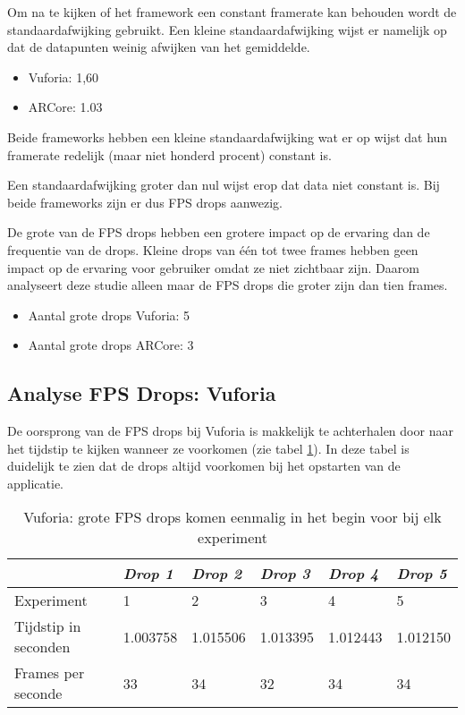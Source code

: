 Om na te kijken of het framework een constant framerate kan behouden wordt de standaardafwijking gebruikt. Een kleine standaardafwijking wijst er namelijk op dat de datapunten weinig afwijken van het gemiddelde.

\begin{itemize}
    \item Vuforia: 1,60
    \item ARCore: 1.03
\end{itemize}

Beide frameworks hebben een kleine standaardafwijking wat er op wijst dat hun framerate redelijk (maar niet honderd procent) constant is. 

Een standaardafwijking groter dan nul wijst erop dat data niet constant is. Bij beide frameworks zijn er dus FPS drops aanwezig.

De grote van de FPS drops hebben een grotere impact op de ervaring dan de frequentie van de drops. Kleine drops van één tot twee frames hebben geen impact op de ervaring voor gebruiker omdat ze niet zichtbaar zijn. Daarom analyseert deze studie alleen maar de FPS drops die groter zijn dan tien frames.

\begin{itemize}
    \item Aantal grote drops Vuforia: 5
    \item Aantal grote drops ARCore: 3
\end{itemize}

\subsection{Analyse FPS Drops: Vuforia}

De oorsprong van de FPS drops bij Vuforia is makkelijk te achterhalen door naar het tijdstip te kijken wanneer ze voorkomen (zie tabel \ref{tbl:vuforiadrop}). In deze tabel is duidelijk te zien dat de drops altijd voorkomen bij het opstarten van de applicatie.

\begin{table}
    \centering
    \begin{tabular}{llllll}\toprule
        & \textit{Drop 1}   & \textit{Drop 2}   & \textit{Drop 3}   & \textit{Drop 4}   & \textit{Drop 5}   \\ \midrule
        Experiment         & 1        & 2        & 3        & 4        & 5        \\
        Tijdstip in seconden          & 1.003758 & 1.015506 & 1.013395 & 1.012443 & 1.012150 \\
        Frames per seconde & 33       & 34       & 32       & 34       & 34      \\ \bottomrule
    \end{tabular}
    \caption{Vuforia: grote FPS drops komen eenmalig in het begin voor bij elk experiment}\label{tbl:vuforiadrop}
\end{table}

